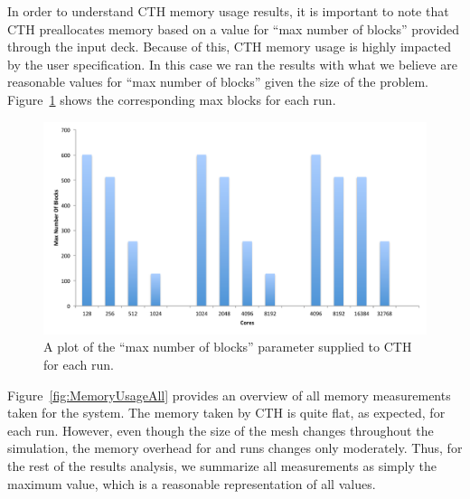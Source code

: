 In order to understand CTH memory usage results, it is important to note that
CTH preallocates memory based on a value for ``max number of blocks'' provided
through the input deck.  Because of this, CTH memory usage is highly impacted
by the user specification.  In this case we ran the results with what we
believe are reasonable values for ``max number of blocks'' given the size of the
problem.  Figure~\ref{fig:MaxBlocks} shows the corresponding max blocks for
each run.

\begin{figure}[htb]
  \centering
  \includegraphics[width=\linewidth]{figures/MaxNumberOfBlocks}
  \caption[Max number of blocks parameter.]{A plot of the ``max number of
    blocks'' parameter supplied to CTH for each run.}
  \label{fig:MaxBlocks}
\end{figure}

Figure~\ref{fig:MemoryUsageAll} provides an overview of all memory
measurements taken for the system.  The memory taken by CTH is quite flat,
as expected, for each run.  However, even though the size of the mesh
changes throughout the simulation, the memory overhead for \insitu and
\intransit runs changes only moderately.  Thus, for the rest of the results
analysis, we summarize all measurements as simply the maximum value, which
is a reasonable representation of all values.


